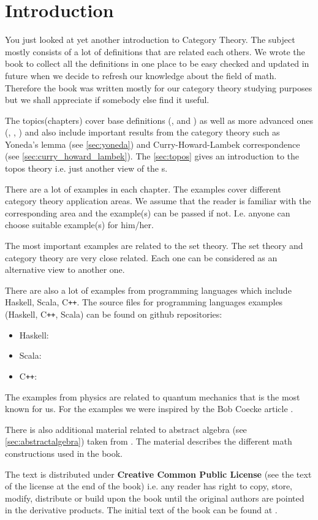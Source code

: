 \chapter*{Introduction}

You just looked at yet another introduction to Category Theory. The
subject mostly consists of a lot of definitions that are related each
others. We wrote the book to collect all the definitions in one
place to be easy checked and updated in future when we decide to refresh
our knowledge about the field of math. Therefore the book was written mostly
for our category theory studying purposes but we shall appreciate if
somebody else find it useful. 

The topics(chapters) cover base definitions
(,  and
) as well as more advanced ones (,
, ) and also include important
results from the category theory such as Yoneda's lemma (see
\cref{sec:yoneda}) and Curry-Howard-Lambek correspondence (see
\cref{sec:curry_howard_lambek}). The \cref{sec:topos} gives an
introduction to the topos theory i.e. just another view of the
s.

There are a lot of examples in each chapter. The examples cover
different category 
theory application areas. We assume that the reader is familiar with
the corresponding area and the example(s) can be passed if not. I.e.
anyone can choose suitable example(s) for him/her. 

The most important examples are related to the set theory. The set
theory and category theory are very close related. Each one can be
considered as an alternative view to another one.

There are also a lot of examples from programming languages which include
Haskell, Scala, C\texttt{++}. The source files for programming languages 
examples (Haskell, C\texttt{++}, Scala) can be found on github repositories:
\begin{itemize}
\item Haskell: \cite{github:cattheory_hs_examples}
\item Scala: \cite{github:cattheory_scala_examples}
\item C\texttt{++}: \cite{github:cattheory_cpp_examples}
\end{itemize}

The examples from physics are related to quantum mechanics that is the
most known for us. For the examples we were inspired by the Bob Coecke
article \cite{bib:arxiv:Bob_Coecke_2008}.

There is also additional material related to abstract algebra (see
\cref{sec:abstractalgebra}) taken from
\cite{github:galois_ivanmurashko}. The material describes the
different math constructions used in the book.

The text is distributed under \textbf{Creative Common Public License}
(see the text of the license at the end of the book)
i.e. any reader has right to copy, store, modify, distribute or build
upon the book until the original authors are pointed in the derivative
products. The initial text of the book can be found at
\cite{github:cattheory_ivanmurashko}.  
